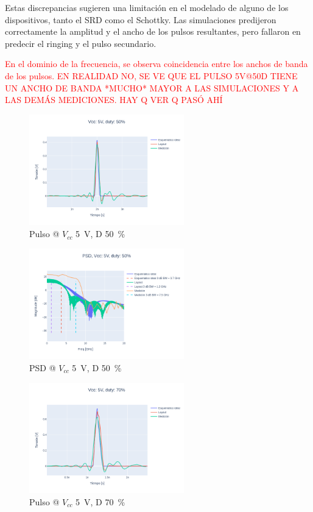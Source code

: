 Estas  discrepancias sugieren una limitación en el modelado de alguno de los 
dispositivos, tanto el SRD como el Schottky. Las simulaciones predijeron correctamente
la amplitud y el ancho de los pulsos resultantes, pero fallaron en predecir 
el ringing y el pulso secundario.

\textcolor{red}{  
En el dominio de la frecuencia, se observa coincidencia entre los anchos de banda de los
pulsos.
EN REALIDAD NO, SE VE QUE EL PULSO 5V@50D TIENE UN ANCHO DE BANDA *MUCHO* MAYOR A 
LAS SIMULACIONES Y A LAS DEMÁS MEDICIONES.
HAY Q VER Q PASÓ AHÍ
}

\begin{figure}
  \centering
    \includegraphics[width=0.6\textwidth]{images/plots/Vcc_5V_duty_50_time_domain.png}
    \caption{Pulso @ $V_{cc}$ \qty{5}{\volt}, D \qty{50}{\percent} }
    \label{fig:plots_5v_50}
\end{figure}

\begin{figure}
  \centering
    \includegraphics[width=0.6\textwidth]{images/plots/Vcc_5V_duty_50_psd.png}
    \caption{PSD @ $V_{cc}$ \qty{5}{\volt}, D \qty{50}{\percent} }
    \label{fig:psd_5v_50}
\end{figure}

\begin{figure}
  \centering
    \includegraphics[width=0.6\textwidth]{images/plots/Vcc_5V_duty_70_time_domain.png}
    \caption{Pulso @ $V_{cc}$ \qty{5}{\volt}, D \qty{70}{\percent} }
    \label{fig:plots_5v_70}
\end{figure}

